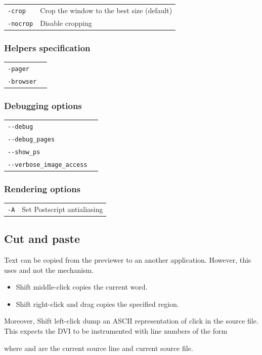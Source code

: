 \documentclass[12pt]{article}
\begin{document}
\medskip\noindent\begin{tabular}{ll}
\verb"-crop"               & Crop the window to the best size (default) \\
\verb"-nocrop"             & Disable cropping
\end{tabular}

\subsubsection*{Helpers specification}

\medskip\noindent\begin{tabular}{ll}
\verb"-pager" & \\
\verb"-browser" & \\
\end{tabular}

\subsubsection*{Debugging options}

\medskip\noindent\begin{tabular}{ll}
\verb"--debug" & \\
\verb"--debug_pages" & \\
\verb"--show_ps" & \\
\verb"--verbose_image_access" & \\
\end{tabular}

\subsubsection*{Rendering options}

\medskip\noindent\begin{tabular}{ll}
\verb"-A" & Set Postscript antialiasing \\
\end{tabular}

\subsection {Cut and paste}

Text can be copied from the {\ActiveDVI} previewer to an another application.
However, this uses  and not the 
mechanism.
\begin {itemize}
\item
Shift middle-click copies the current word. 
\item
Shift right-click and drag copies the specified region. 
\end {itemize}
Moreover, Shift left-click dump an ASCII representation of click 
in the source file. This expects the DVI to be instrumented with line
numbers of the form
\begin{quote}
  
\end{quote}
where  and  are the current source line and
current source file.
\end{document}
